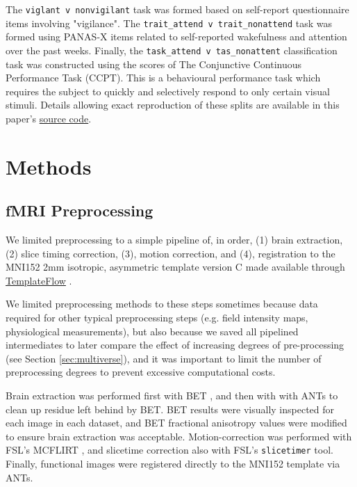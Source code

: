 \documentclass[12pt]{spieman}  %
\newcommand{\code}[1]{\small \texttt{#1} \normalsize}
\begin{document}
\begin{spacing}{2}
The \code{viglant v nonvigilant} task was formed based on self-report
questionnaire items involving
"vigilance"\cite{gorgolewskiCorrespondenceIndividualDifferences2014}. The
\code{trait\_attend v trait\_nonattend} task was formed using PANAS-X
\cite{watsonPANASXManualPositive1994} items related to self-reported
wakefulness and attention over the past weeks. Finally, the
\code{task\_attend v tas\_nonattent} classification task was constructed
using the scores of The Conjunctive Continuous Performance Task
(CCPT\cite{shalevConjunctiveContinuousPerformance2011}). This is a behavioural
performance task which requires the subject to quickly and selectively respond
to only certain visual stimuli. Details allowing exact reproduction of these
splits are available in this paper's
\href{https://github.com/DM-Berger/random-matrix-fmri/blob/master/code/rmt/preprocess/unify\_attention\_data.py}{source
code}.



\section{Methods}
\label{sect:methods}

\subsection{fMRI Preprocessing}


We limited preprocessing to a simple pipeline of, in order, (1) brain
extraction, (2) slice timing correction, (3), motion correction, and (4),
registration to the MNI152
\cite{fonovUnbiasedAverageAgeappropriate2011,fonovUnbiasedNonlinearAverage2009}
2mm isotropic, asymmetric template version C made available through
\href{https://www.templateflow.org/}{TemplateFlow}
\cite{ciricTemplateFlowFAIRsharingMultiscale2021}.

We limited preprocessing methods to these steps sometimes because data required
for other typical preprocessing steps (e.g. field intensity maps, physiological
measurements), but also because we saved all pipelined intermediates to later
compare the effect of increasing degrees of pre-processing (see Section
\ref{sec:multiverse}), and it was important to limit the number of
preprocessing degrees to prevent excessive computational costs.

Brain extraction was performed first with BET
\cite{smithFastRobustAutomated2002}, and then with with
ANTs\cite{avantsReproducibleEvaluationANTs2011} to clean up residue left behind
by BET. BET results were visually inspected for each image in each dataset, and
BET fractional anisotropy values were modified to ensure brain extraction was
acceptable. Motion-correction was performed with FSL's MCFLIRT
\cite{jenkinsonImprovedOptimizationRobust2002}, and slicetime correction also
with FSL's \code{slicetimer}\cite{jenkinsonFSL2012} tool. Finally, functional
images were registered directly to the MNI152 template via
ANTs\cite{avantsReproducibleEvaluationANTs2011}.



\end{spacing}
\end{document}

